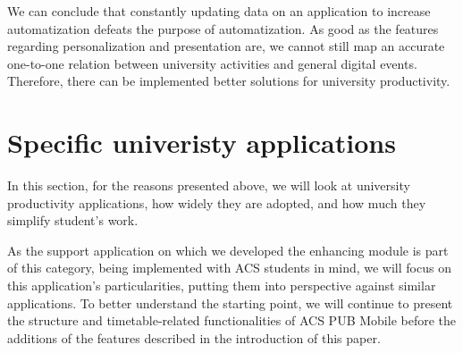 	We can conclude that constantly updating data on an application to increase automatization defeats the purpose of automatization. As good as the features regarding personalization and presentation are, we cannot still map an accurate one-to-one relation between university activities and general digital events. Therefore, there can be implemented better solutions for university productivity.





\section{Specific univeristy applications} \label{3:specificapp}


In this section, for the reasons presented above, we will look at university productivity applications, how widely they are adopted, and how much they simplify student’s work.

As the support application on which we developed the enhancing module is part of this category, being implemented with ACS students in mind, we will focus on this application’s particularities, putting them into perspective against similar applications. To better understand the starting point, we will continue to present the structure and timetable-related functionalities of ACS PUB Mobile before the additions of the features described in the introduction of this paper. 


